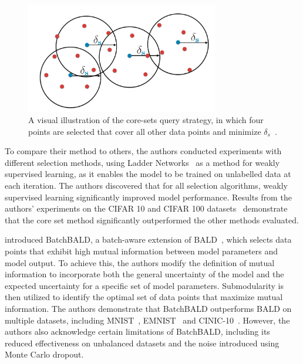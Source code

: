 \begin{figure}[h]
	\centering
	\includegraphics[width=0.75\textwidth]{images/core-set.png}
	\caption{A visual illustration of the core-sets query strategy, in which four points are selected that cover all other data points and minimize $\delta_s$~\citep{sener2017active}.}
	\label{fig:core-set}
\end{figure}

To compare their method to others, the authors conducted experiments with different selection methods, using Ladder Networks~\citep{rasmus2015semi} as a method for weakly supervised learning, as it enables the model to be trained on unlabelled data at each iteration. The authors discovered that for all selection algorithms, weakly supervised learning significantly improved model performance. Results from the authors' experiments on the CIFAR 10 and CIFAR 100 datasets~\citep{krizhevsky2009learning} demonstrate that the core set method significantly outperformed the other methods evaluated.

\cite{kirsch2019batchbald} introduced BatchBALD, a batch-aware extension of BALD~\citep{gal2017deep}, which selects data points that exhibit high mutual information between model parameters and model output. To achieve this, the authors modify the definition of mutual information to incorporate both the general uncertainty of the model and the expected uncertainty for a specific set of model parameters. Submodularity is then utilized to identify the optimal set of data points that maximize mutual information. The authors demonstrate that BatchBALD outperforms BALD on multiple datasets, including MNIST~\citep{lecun1998gradient}, EMNIST~\citep{cohen2017emnist} and CINIC-10~\citep{darlow2018cinic}. However, the authors also acknowledge certain limitations of BatchBALD, including its reduced effectiveness on unbalanced datasets and the noise introduced using Monte Carlo dropout.

